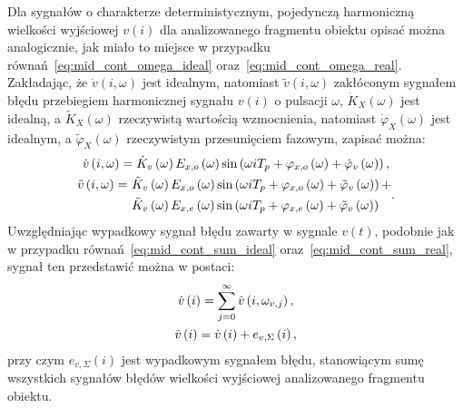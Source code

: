 Dla sygnałów o charakterze deterministycznym, pojedynczą harmoniczną wielkości wyjściowej $v(i)$ dla analizowanego fragmentu obiektu opisać można analogicznie, jak miało to miejsce w przypadku równań~\eqref{eq:mid_cont_omega_ideal} oraz~\eqref{eq:mid_cont_omega_real}. Zakładając, że $\dot{v}(i,\omega)$ jest idealnym, natomiast $\tilde{v}(i,\omega)$ zakłóconym sygnałem błędu przebiegiem harmonicznej sygnału $v(i)$ o pulsacji $\omega$, $\dot{K}_{X}(\omega)$ jest idealną, a $\tilde{K}_{X}(\omega)$ rzeczywistą wartością wzmocnienia, natomiast $\dot{\varphi}_{X}(\omega)$ jest idealnym, a $\tilde{\varphi}_{X}(\omega)$ rzeczywistym przesunięciem fazowym, zapisać można:
\begin{gather}
\dot{v} \left(i,\omega\right) = \dot{K}_{v} \left(\omega\right) E_{x,o} \left(\omega\right) \sin \left( \omega iT_{p} + \varphi_{x,o} \left(\omega\right) + \dot{\varphi}_{v} \left(\omega\right) \right) \label{eq:mid_disc_omega_ideal}, \\
\begin{split}
\tilde{v} \left(i,\omega\right) =~
& \tilde{K}_{v} \left(\omega\right) E_{x,o} \left(\omega\right) \sin \left( \omega iT_{p} + \varphi_{x,o} \left(\omega\right) + \tilde{\varphi}_{v} \left(\omega\right) \right) + \\
& \tilde{K}_{v} \left(\omega\right) E_{x,e} \left(\omega\right) \sin \left( \omega iT_{p} + \varphi_{x,e} \left(\omega\right) + \tilde{\varphi}_{v} \left(\omega\right) \right)
\end{split}
\label{eq:mid_disc_omega_real}.
\end{gather}
Uwzględniając wypadkowy sygnał błędu zawarty w sygnale $v(t)$, podobnie jak w przypadku równań~\eqref{eq:mid_cont_sum_ideal} oraz~\eqref{eq:mid_cont_sum_real}, sygnał ten przedstawić można w postaci:
\begin{gather}
\dot{v} \left(i\right) = \sum _{j = 0} ^{\infty} \dot{v} \left( i, \omega_{v,j} \right) \label{eq:mid_disc_sum_ideal}, \\
\tilde{v} \left(i\right) = \dot{v} \left(i\right) + e_{v,\Sigma} \left(i\right) \label{eq:mid_disc_sum_real},
\end{gather}
przy czym $e_{v,\Sigma}(i)$ jest wypadkowym sygnałem błędu, stanowiącym sumę wszystkich sygnałów błędów wielkości wyjściowej analizowanego fragmentu obiektu.

